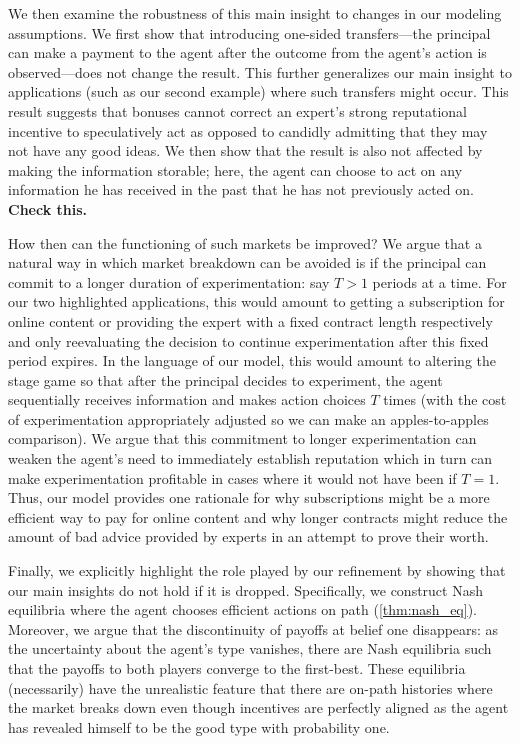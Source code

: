 \documentclass[11pt,reqno]{amsart}
\begin{document}
We then examine the robustness of this main insight to changes in our modeling assumptions. We first show that introducing one-sided transfers---the principal can make a payment to the agent after the outcome from the agent's action is observed---does not change the result. This further generalizes our main insight to applications (such as our second example) where such transfers might occur. This result suggests that bonuses cannot correct an expert's strong reputational incentive to speculatively act as opposed to candidly admitting that they may not have any good ideas. We then show that the result is also not affected by making the information storable; here, the agent can choose to act on any information he has received in the past that he has not previously acted on. \textbf{Check this.}

How then can the functioning of such markets be improved? We argue that a natural way in which market breakdown can be avoided is if the principal can commit to a longer duration of experimentation: say $T>1$ periods at a time. For our two highlighted applications, this would amount to getting a subscription for online content or providing the expert with a fixed contract length respectively and only reevaluating the decision to continue experimentation after this fixed period expires. In the language of our model, this would amount to altering the stage game so that after the principal decides to experiment, the agent sequentially receives information and makes action choices $T$ times (with the cost of experimentation appropriately adjusted so we can make an apples-to-apples comparison). We argue that this commitment to longer experimentation can weaken the agent's need to immediately establish reputation which in turn can make experimentation profitable in cases where it would not have been if $T=1$. Thus, our model provides one rationale for why subscriptions might be a more efficient way to pay for online content and why longer contracts might reduce the amount of bad advice provided by experts in an attempt to prove their worth.

Finally, we explicitly highlight the role played by our refinement by showing that our main insights do not hold if it is dropped. Specifically, we construct Nash equilibria where the agent chooses efficient actions on path (\cref{thm:nash_eq}). Moreover, we argue that the discontinuity of payoffs at belief one disappears: as the uncertainty about the agent's type vanishes, there are Nash equilibria such that the payoffs to both players converge to the first-best. These equilibria (necessarily) have the unrealistic feature that there are on-path histories where the market breaks down even though incentives are perfectly aligned as the agent has revealed himself to be the good type with probability one.
\end{document}
